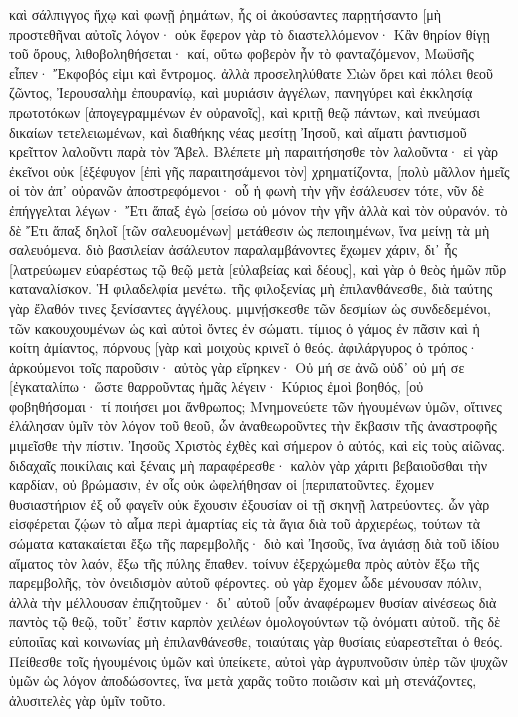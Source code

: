 καὶ σάλπιγγος ἤχῳ καὶ φωνῇ ῥημάτων, ἧς οἱ ἀκούσαντες παρῃτήσαντο [μὴ προστεθῆναι αὐτοῖς λόγον· 
οὐκ ἔφερον γὰρ τὸ διαστελλόμενον· Κἂν θηρίον θίγῃ τοῦ ὄρους, λιθοβοληθήσεται· 
καί, οὕτω φοβερὸν ἦν τὸ φανταζόμενον, Μωϋσῆς εἶπεν· Ἔκφοβός εἰμι καὶ ἔντρομος. 
ἀλλὰ προσεληλύθατε Σιὼν ὄρει καὶ πόλει θεοῦ ζῶντος, Ἰερουσαλὴμ ἐπουρανίῳ, καὶ μυριάσιν ἀγγέλων, πανηγύρει 
καὶ ἐκκλησίᾳ πρωτοτόκων [ἀπογεγραμμένων ἐν οὐρανοῖς], καὶ κριτῇ θεῷ πάντων, καὶ πνεύμασι δικαίων τετελειωμένων, 
καὶ διαθήκης νέας μεσίτῃ Ἰησοῦ, καὶ αἵματι ῥαντισμοῦ κρεῖττον λαλοῦντι παρὰ τὸν Ἅβελ. 
Βλέπετε μὴ παραιτήσησθε τὸν λαλοῦντα· εἰ γὰρ ἐκεῖνοι οὐκ [ἐξέφυγον [ἐπὶ γῆς παραιτησάμενοι τὸν] χρηματίζοντα, [πολὺ μᾶλλον ἡμεῖς οἱ τὸν ἀπ᾽ οὐρανῶν ἀποστρεφόμενοι· 
οὗ ἡ φωνὴ τὴν γῆν ἐσάλευσεν τότε, νῦν δὲ ἐπήγγελται λέγων· Ἔτι ἅπαξ ἐγὼ [σείσω οὐ μόνον τὴν γῆν ἀλλὰ καὶ τὸν οὐρανόν. 
τὸ δὲ Ἔτι ἅπαξ δηλοῖ [τῶν σαλευομένων] μετάθεσιν ὡς πεποιημένων, ἵνα μείνῃ τὰ μὴ σαλευόμενα. 
διὸ βασιλείαν ἀσάλευτον παραλαμβάνοντες ἔχωμεν χάριν, δι᾽ ἧς [λατρεύωμεν εὐαρέστως τῷ θεῷ μετὰ [εὐλαβείας καὶ δέους], 
καὶ γὰρ ὁ θεὸς ἡμῶν πῦρ καταναλίσκον. 
Ἡ φιλαδελφία μενέτω. 
τῆς φιλοξενίας μὴ ἐπιλανθάνεσθε, διὰ ταύτης γὰρ ἔλαθόν τινες ξενίσαντες ἀγγέλους. 
μιμνῄσκεσθε τῶν δεσμίων ὡς συνδεδεμένοι, τῶν κακουχουμένων ὡς καὶ αὐτοὶ ὄντες ἐν σώματι. 
τίμιος ὁ γάμος ἐν πᾶσιν καὶ ἡ κοίτη ἀμίαντος, πόρνους [γὰρ καὶ μοιχοὺς κρινεῖ ὁ θεός. 
ἀφιλάργυρος ὁ τρόπος· ἀρκούμενοι τοῖς παροῦσιν· αὐτὸς γὰρ εἴρηκεν· Οὐ μή σε ἀνῶ οὐδ᾽ οὐ μή σε [ἐγκαταλίπω· 
ὥστε θαρροῦντας ἡμᾶς λέγειν· Κύριος ἐμοὶ βοηθός, [οὐ φοβηθήσομαι· τί ποιήσει μοι ἄνθρωπος; 
Μνημονεύετε τῶν ἡγουμένων ὑμῶν, οἵτινες ἐλάλησαν ὑμῖν τὸν λόγον τοῦ θεοῦ, ὧν ἀναθεωροῦντες τὴν ἔκβασιν τῆς ἀναστροφῆς μιμεῖσθε τὴν πίστιν. 
Ἰησοῦς Χριστὸς ἐχθὲς καὶ σήμερον ὁ αὐτός, καὶ εἰς τοὺς αἰῶνας. 
διδαχαῖς ποικίλαις καὶ ξέναις μὴ παραφέρεσθε· καλὸν γὰρ χάριτι βεβαιοῦσθαι τὴν καρδίαν, οὐ βρώμασιν, ἐν οἷς οὐκ ὠφελήθησαν οἱ [περιπατοῦντες. 
ἔχομεν θυσιαστήριον ἐξ οὗ φαγεῖν οὐκ ἔχουσιν ἐξουσίαν οἱ τῇ σκηνῇ λατρεύοντες. 
ὧν γὰρ εἰσφέρεται ζῴων τὸ αἷμα περὶ ἁμαρτίας εἰς τὰ ἅγια διὰ τοῦ ἀρχιερέως, τούτων τὰ σώματα κατακαίεται ἔξω τῆς παρεμβολῆς· 
διὸ καὶ Ἰησοῦς, ἵνα ἁγιάσῃ διὰ τοῦ ἰδίου αἵματος τὸν λαόν, ἔξω τῆς πύλης ἔπαθεν. 
τοίνυν ἐξερχώμεθα πρὸς αὐτὸν ἔξω τῆς παρεμβολῆς, τὸν ὀνειδισμὸν αὐτοῦ φέροντες. 
οὐ γὰρ ἔχομεν ὧδε μένουσαν πόλιν, ἀλλὰ τὴν μέλλουσαν ἐπιζητοῦμεν· 
δι᾽ αὐτοῦ [οὖν ἀναφέρωμεν θυσίαν αἰνέσεως διὰ παντὸς τῷ θεῷ, τοῦτ᾽ ἔστιν καρπὸν χειλέων ὁμολογούντων τῷ ὀνόματι αὐτοῦ. 
τῆς δὲ εὐποιΐας καὶ κοινωνίας μὴ ἐπιλανθάνεσθε, τοιαύταις γὰρ θυσίαις εὐαρεστεῖται ὁ θεός. 
Πείθεσθε τοῖς ἡγουμένοις ὑμῶν καὶ ὑπείκετε, αὐτοὶ γὰρ ἀγρυπνοῦσιν ὑπὲρ τῶν ψυχῶν ὑμῶν ὡς λόγον ἀποδώσοντες, ἵνα μετὰ χαρᾶς τοῦτο ποιῶσιν καὶ μὴ στενάζοντες, ἀλυσιτελὲς γὰρ ὑμῖν τοῦτο. 
